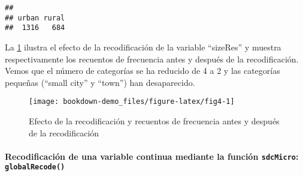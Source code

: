 \documentclass[
]{book}
\newenvironment{Shaded}{\begin{snugshade}}{\end{snugshade}}
\newcommand{\AttributeTok}[1]{\textcolor[rgb]{0.77,0.63,0.00}{#1}}
\newcommand{\CommentTok}[1]{\textcolor[rgb]{0.56,0.35,0.01}{\textit{#1}}}
\newcommand{\FunctionTok}[1]{\textcolor[rgb]{0.00,0.00,0.00}{#1}}
\newcommand{\NormalTok}[1]{#1}
\newcommand{\OtherTok}[1]{\textcolor[rgb]{0.56,0.35,0.01}{#1}}
\newcommand{\SpecialCharTok}[1]{\textcolor[rgb]{0.00,0.00,0.00}{#1}}
\newcommand{\StringTok}[1]{\textcolor[rgb]{0.31,0.60,0.02}{#1}}
\theoremstyle{definition}
\theoremstyle{definition}
\theoremstyle{definition}
\theoremstyle{definition}
\theoremstyle{remark}
\begin{document}
\begin{Shaded}
\end{Shaded}

\begin{verbatim}
## 
## urban rural 
##  1316   684
\end{verbatim}

La \ref{fig:fig4} ilustra el efecto de la recodificación de la variable ``sizeRes'' y muestra respectivamente los recuentos de frecuencia antes y después de la recodificación. Vemos que el número de categorías se ha reducido de 4 a 2 y las categorías pequeñas (``small city'' y ``town'') han desaparecido.

\begin{figure}
\texttt{[image: bookdown-demo\_files/figure-latex/fig4-1]} \caption{Efecto de la recodificación y recuentos de frecuencia antes y después de la recodificación}\label{fig:fig4}
\end{figure}

\hypertarget{recodificaciuxf3n-de-una-variable-continua-mediante-la-funciuxf3n-sdcmicro-globalrecode}{%
\paragraph{\texorpdfstring{Recodificación de una variable continua mediante la función \texttt{sdcMicro}: \texttt{globalRecode()}}{Recodificación de una variable continua mediante la función sdcMicro: globalRecode()}}\label{recodificaciuxf3n-de-una-variable-continua-mediante-la-funciuxf3n-sdcmicro-globalrecode}}
\end{document}
